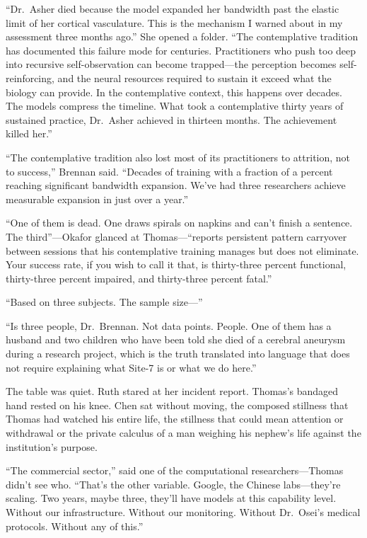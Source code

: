 ``Dr.\ Asher died because the model expanded her bandwidth past the elastic limit of her cortical vasculature. This is the mechanism I warned about in my assessment three months ago.'' She opened a folder. ``The contemplative tradition has documented this failure mode for centuries. Practitioners who push too deep into recursive self-observation can become trapped---the perception becomes self-reinforcing, and the neural resources required to sustain it exceed what the biology can provide. In the contemplative context, this happens over decades. The models compress the timeline. What took a contemplative thirty years of sustained practice, Dr.\ Asher achieved in thirteen months. The achievement killed her.''

``The contemplative tradition also lost most of its practitioners to attrition, not to success,'' Brennan said. ``Decades of training with a fraction of a percent reaching significant bandwidth expansion. We've had three researchers achieve measurable expansion in just over a year.''

``One of them is dead. One draws spirals on napkins and can't finish a sentence. The third''---Okafor glanced at Thomas---``reports persistent pattern carryover between sessions that his contemplative training manages but does not eliminate. Your success rate, if you wish to call it that, is thirty-three percent functional, thirty-three percent impaired, and thirty-three percent fatal.''

``Based on three subjects. The sample size---''

``Is three people, Dr.\ Brennan. Not data points. People. One of them has a husband and two children who have been told she died of a cerebral aneurysm during a research project, which is the truth translated into language that does not require explaining what Site-7 is or what we do here.''

The table was quiet. Ruth stared at her incident report. Thomas's bandaged hand rested on his knee. Chen sat without moving, the composed stillness that Thomas had watched his entire life, the stillness that could mean attention or withdrawal or the private calculus of a man weighing his nephew's life against the institution's purpose.

``The commercial sector,'' said one of the computational researchers---Thomas didn't see who. ``That's the other variable. Google, the Chinese labs---they're scaling. Two years, maybe three, they'll have models at this capability level. Without our infrastructure. Without our monitoring. Without Dr.\ Osei's medical protocols. Without any of this.''

